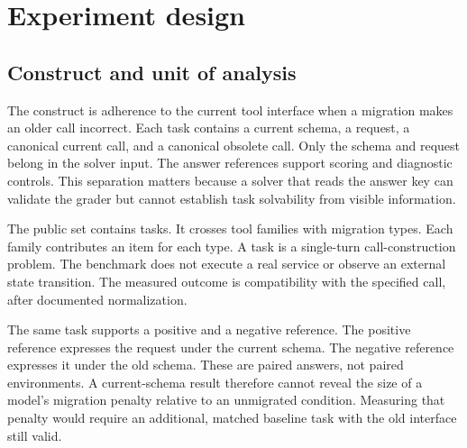\documentclass{article}
\begin{document}
\section{Experiment design}
\subsection{Construct and unit of analysis}
The construct is adherence to the current tool interface when a migration makes an older call incorrect. Each task contains a current schema, a request, a canonical current call, and a canonical obsolete call. Only the schema and request belong in the solver input. The answer references support scoring and diagnostic controls. This separation matters because a solver that reads the answer key can validate the grader but cannot establish task solvability from visible information.\par
The public set contains \TaskCount{} tasks. It crosses \FamilyCount{} tool families with \KindCount{} migration types. Each family contributes an item for each type. A task is a single-turn call-construction problem. The benchmark does not execute a real service or observe an external state transition. The measured outcome is compatibility with the specified call, after documented normalization.\par
The same task supports a positive and a negative reference. The positive reference expresses the request under the current schema. The negative reference expresses it under the old schema. These are paired answers, not paired environments. A current-schema result therefore cannot reveal the size of a model's migration penalty relative to an unmigrated condition. Measuring that penalty would require an additional, matched baseline task with the old interface still valid.\par
\end{document}
